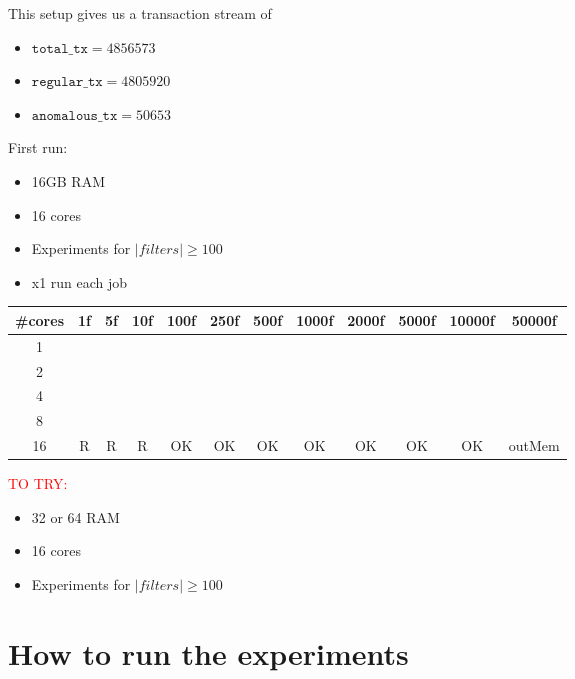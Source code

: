 This setup gives us a transaction stream of 
\begin{itemize}
  \item $\texttt{total\_tx} = 4856573$
  \item $\texttt{regular\_tx} = 4805920$
  \item $\texttt{anomalous\_tx} = 50653$
\end{itemize}

First run:
\begin{itemize}
    \item 16GB RAM
    \item 16 cores
    \item Experiments for $|filters|\ge100$
    \item x1 run each job
\end{itemize}

\begin{table}[H]
\begin{tabular}{|c|c|c|c|c|c|c|c|c|c|c|c|}
\hline
\#cores & 1f & 5f & 10f & 100f & 250f & 500f & 1000f & 2000f & 5000f & 10000f & 50000f \\ \hline
1       &    &    &     &      &      &      &       &       &       &        &        \\ \hline
2       &    &    &     &      &      &      &       &       &       &        &        \\ \hline
4       &    &    &     &      &      &      &       &       &       &        &        \\ \hline
8       &    &    &     &      &      &      &       &       &       &        &        \\ \hline
16      & R & R & R & OK & OK & OK & OK & OK & OK & OK & outMem \\ \hline
\end{tabular}
\end{table}

\textcolor{red}{TO TRY:}
\begin{itemize}
    \item 32 or 64 RAM
    \item 16 cores
    \item Experiments for $|filters|\ge100$
\end{itemize}


\section{How to run the experiments}

